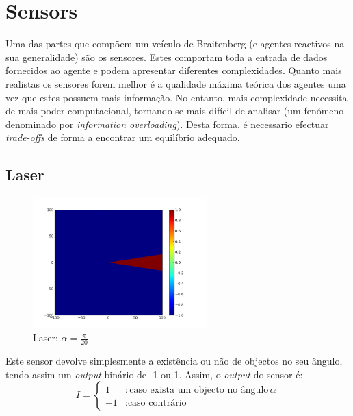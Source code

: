 \documentclass[a4paper]{article}
\begin{document}
\cleardoublepage
\section{Sensors}
\indent \indent Uma das partes que compõem um veículo de Braitenberg (e agentes reactivos na sua generalidade) são os sensores.
Estes comportam toda a entrada de dados fornecidos ao agente e podem apresentar diferentes complexidades.
Quanto mais realistas os sensores forem melhor é a qualidade máxima teórica dos agentes uma vez que estes possuem mais informação.
No entanto, mais complexidade necessita de mais poder computacional, tornando-se mais difícil de analisar (um fenómeno denominado por \emph{information overloading}).
Desta forma, é necessario efectuar \emph{trade-offs} de forma a encontrar um equilíbrio adequado.

\subsection{Laser}

\begin{figure}[h]
	\vspace{-20pt}
	\begin{center}
		\includegraphics[width=0.6\textwidth]{graphs/sensors/laser.png}
	\end{center}
	\vspace{-20pt}
	\caption{Laser: $\alpha=\frac{\pi}{20}$}
\end{figure}

\indent Este sensor devolve simplesmente a existência ou não de objectos no seu ângulo, tendo assim um \emph{output} binário de -1 ou 1.
Assim, o \emph{output} do sensor é:
\[
	I = \left\{
		\begin{array}{lr}
			1 & : \text{caso exista um objecto no ângulo}\, \alpha \\
			-1 & : \text{caso contrário}
		\end{array}
		\right.
\]
\end{document}
